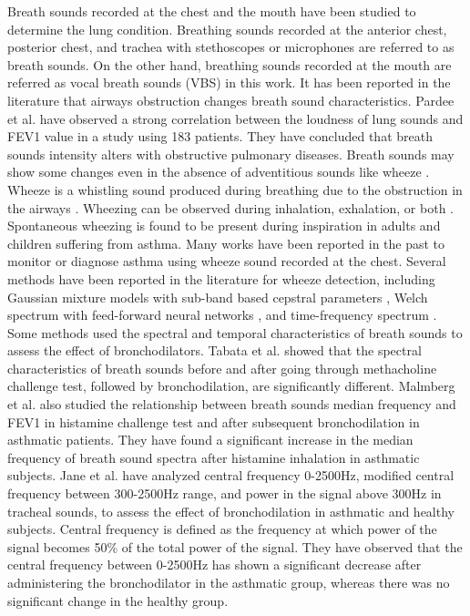 \documentclass{article}
\begin{document}
Breath sounds recorded at the chest and the mouth have been studied to determine the lung condition. Breathing sounds recorded at the anterior chest, posterior chest, and trachea with stethoscopes or microphones are referred to as breath sounds. On the other hand, breathing sounds recorded at the mouth are referred as vocal breath sounds (VBS) in this work. It has been reported in the literature that airways obstruction changes breath sound characteristics. 
Pardee et al. \cite{pardee1976test} have observed a strong correlation between the loudness of lung sounds and FEV1 value in a study using 183 patients. They have concluded that breath sounds intensity alters with obstructive pulmonary diseases. Breath sounds may show some changes even in the absence of adventitious sounds like wheeze \cite{malmberg1994frequency}. Wheeze is a whistling sound produced during breathing due to the obstruction in the airways \cite{forgacs1971breath}. Wheezing can be observed during inhalation, exhalation, or both \cite{pramono2017automatic}. Spontaneous wheezing is found to be present during inspiration in adults \cite{shim1983relationship} and children \cite{sanchez1993acoustic} suffering from asthma. Many works have been reported in the past to monitor or diagnose asthma using wheeze sound recorded at the chest. Several methods have been reported in the literature for wheeze detection, including Gaussian mixture models with sub-band based cepstral parameters \cite{bahoura2004respiratory}, Welch spectrum with feed-forward neural networks \cite{oud2003lung}, and time-frequency spectrum \cite{forkheim1995comparison}. Some methods used the spectral and temporal characteristics of breath sounds to assess the effect of bronchodilators.
Tabata et al. \cite{tabata2018changes} showed that the spectral characteristics of breath sounds before and after going through methacholine challenge test, followed by bronchodilation, are significantly different. Malmberg et al. \cite{malmberg1994frequency} also studied the relationship between breath sounds median frequency and FEV1 in histamine challenge test and after subsequent bronchodilation in asthmatic patients. They have found a significant increase in the median frequency of breath sound spectra after histamine inhalation in asthmatic subjects.  
Jane et al. \cite{jane1998spectral} have analyzed central frequency 0-2500Hz, modified central frequency between 300-2500Hz range, and power in the signal above 300Hz in tracheal sounds, to assess the effect of bronchodilation in asthmatic and healthy subjects. Central frequency is defined as the frequency at which power of the signal becomes 50\% of the total power of the signal. They have observed that the central frequency between 0-2500Hz has shown a significant decrease after administering the bronchodilator in the asthmatic group, whereas there was no significant change in the healthy group.
\end{document}
